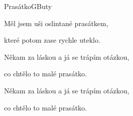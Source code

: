 \begin{song}{Prasátko}{G}{Buty}

\Ch{$|$:}{}     \Ch{:$|$}{}
\begin{SBVerse}




\end{SBVerse}

\begin{SBVerse}

Měl jsem uši oslintané prasátkem,

které potom zase rychle uteklo.

Někam za láskou a já se trápím otázkou,

co chtělo to malé prasátko.

Někam za láskou a já se trápím otázkou,

co chtělo to malé prasátko.

\end{SBVerse}

\end{song}

\pagebreak
